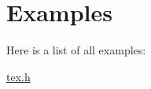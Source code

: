 \section{Examples}
Here is a list of all examples\-:\begin{DoxyCompactItemize}
\item 
\hyperlink{tex_8h-example}{tex.\-h}
\end{DoxyCompactItemize}
